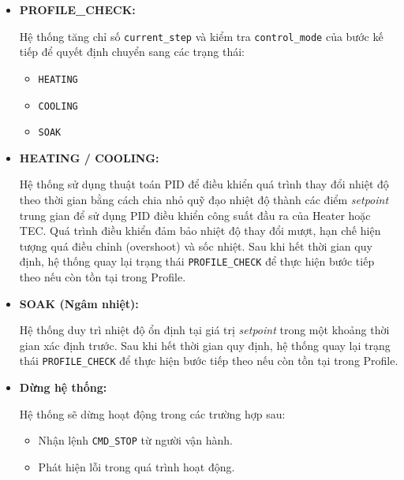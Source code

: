 \begin{itemize}
\begin{itemize}
    Mục tiêu của giai đoạn này là đưa hệ thống vào vùng ổn định nhiệt trước khi thực hiện các bước tiếp theo trong quy trình.

    \item \textbf{PROFILE\_CHECK:}
    
    Hệ thống tăng chỉ số \texttt{current\_step} và kiểm tra \texttt{control\_mode} của bước kế tiếp để quyết định chuyển sang các trạng thái:
    
    \begin{itemize}
        \item \texttt{HEATING}
        \item \texttt{COOLING}
        \item \texttt{SOAK}
    \end{itemize}

    \item \textbf{HEATING / COOLING:}
    
    Hệ thống sử dụng thuật toán PID để điều khiển quá trình thay đổi nhiệt độ theo thời gian bằng cách chia nhỏ quỹ đạo nhiệt độ thành các điểm \textit{setpoint} trung gian để sử dụng PID điều khiển công suất đầu ra của Heater hoặc TEC. Quá trình điều khiển đảm bảo nhiệt độ thay đổi mượt, hạn chế hiện tượng quá điều chỉnh (overshoot) và sốc nhiệt. Sau khi hết thời gian quy định, hệ thống quay lại trạng thái \texttt{PROFILE\_CHECK} để thực hiện bước tiếp theo nếu còn tồn tại trong Profile.


    \item \textbf{SOAK (Ngâm nhiệt):}
    
    Hệ thống duy trì nhiệt độ ổn định tại giá trị \textit{setpoint} trong một khoảng thời gian xác định trước. Sau khi hết thời gian quy định, hệ thống quay lại trạng thái \texttt{PROFILE\_CHECK} để thực hiện bước tiếp theo nếu còn tồn tại trong Profile.

    \item \textbf{Dừng hệ thống:}
    
    Hệ thống sẽ dừng hoạt động trong các trường hợp sau:
    
    \begin{itemize}
        \item Nhận lệnh \texttt{CMD\_STOP} từ người vận hành.
        
        \item Phát hiện lỗi trong quá trình hoạt động.
    \end{itemize}

\end{itemize}



\end{itemize}
